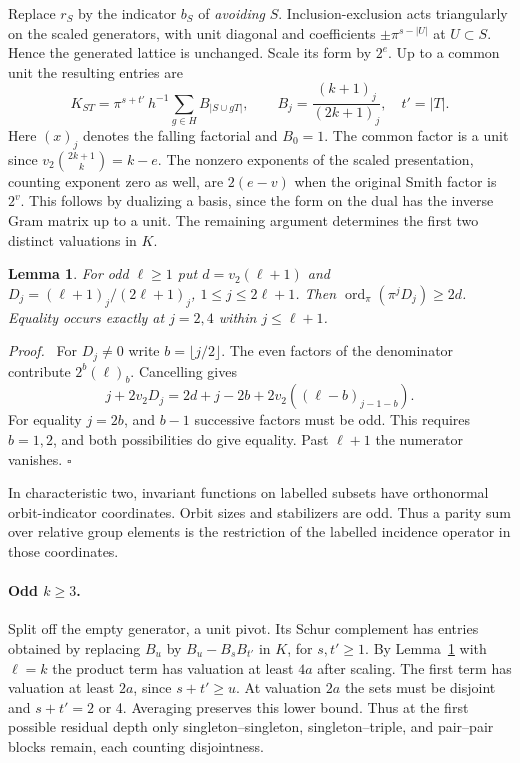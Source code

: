 \documentclass[11pt]{article}
\newtheorem{lemma}{Lemma}
\newenvironment{proof}{\par\noindent\textit{Proof.}\ }{\hfill\(\square\)\par}
\newcommand{\val}{v_2}
\newcommand{\ord}{\operatorname{ord}_{\pi}}
\begin{document}
Replace \(r_S\) by the indicator \(b_S\) of \emph{avoiding} \(S\).
Inclusion-exclusion acts triangularly on the scaled generators, with
unit diagonal and coefficients \(\pm\pi^{s-|U|}\) at \(U\subset S\).
Hence the generated lattice is unchanged. Scale its form by \(2^e\).
Up to a common unit the resulting entries are
\[
 K_{ST}=\pi^{s+t'}\,h^{-1}\sum_{g\in H} B_{|S\cup gT|},\qquad
 B_j=\frac{(k+1)_j}{(2k+1)_j},\quad t'=|T|.
\]
Here \((x)_j\) denotes the falling factorial and \(B_0=1\). The common
factor is a unit since \(\val\binom{2k+1}{k}=k-e\).
The nonzero exponents of the scaled presentation, counting exponent
zero as well, are \(2(e-v)\) when the original Smith factor is \(2^v\).
This follows by dualizing a basis, since the form on the dual has the
inverse Gram matrix up to a unit. The remaining argument determines
the first two distinct valuations in \(K\).

\begin{lemma}\label{lem}
For odd \(\ell\ge1\) put \(d=\val(\ell+1)\) and
\(D_j=(\ell+1)_j/(2\ell+1)_j\), \(1\le j\le2\ell+1\).
Then \(\ord(\pi^jD_j)\ge2d\). Equality occurs exactly at \(j=2,4\)
within \(j\le\ell+1\).
\end{lemma}
\begin{proof}
For \(D_j\ne0\) write \(b=\lfloor j/2\rfloor\). The even factors of
the denominator contribute \(2^b(\ell)_b\). Cancelling gives
\[
 j+2\val D_j=2d+j-2b+2\val((\ell-b)_{j-1-b}).
\]
For equality \(j=2b\), and \(b-1\) successive factors must be odd.
This requires \(b=1,2\), and both possibilities do give equality.
Past \(\ell+1\) the numerator vanishes.
\end{proof}

In characteristic two, invariant functions on labelled subsets have
orthonormal orbit-indicator coordinates. Orbit sizes and stabilizers
are odd. Thus a parity sum over relative group elements is the
restriction of the labelled incidence operator in those coordinates.

\paragraph{Odd \(k\ge3\).}
Split off the empty generator, a unit pivot. Its Schur complement has
entries obtained by replacing \(B_u\) by \(B_u-B_sB_{t'}\) in \(K\),
for \(s,t'\ge1\). By Lemma~\ref{lem} with \(\ell=k\) the product term
has valuation at least \(4a\) after scaling. The first term has valuation
at least \(2a\), since \(s+t'\ge u\). At valuation \(2a\) the sets must
be disjoint and \(s+t'=2\) or 4. Averaging preserves this lower bound.
Thus at the first possible residual depth only singleton--singleton,
singleton--triple, and pair--pair blocks remain, each counting disjointness.
\end{document}
